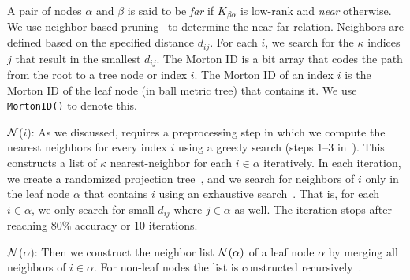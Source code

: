 A pair of nodes $\alpha$ and $\beta$ is said to be \emph{far} if
$K_{\beta\alpha}$ is low-rank and \emph{near} otherwise.
We use neighbor-based pruning~\cite{march-xiao-yu-biros-sisc16}
to determine the near-far relation.
Neighbors are  defined based on the specified distance
$d_{ij}$. For each $i$, we search for the $\kappa$ indices $j$
that result in the smallest $d_{ij}$.
The Morton ID is a bit array that codes the path from the root to a tree node or index $i$. The Morton ID of an index $i$ is the Morton ID of the leaf node (in \gofmm{} ball metric tree) that contains it.
We use \texttt{MortonID()} to denote this. 


 ${\mathcal N}$($i$): As we discussed, \gofmm{}
requires a preprocessing step in which we compute the nearest neighbors for 
every index $i$ using a greedy search (steps 1--3 in~). 
This constructs a list of $\kappa$ nearest-neighbor for each $i\in\alpha$
iteratively.
In each iteration, we create a randomized projection
tree~\cite{dasgupta-freund08,liberty2007randomized,march-xiao-yu-biros-sisc16},
and we search for neighbors of $i$ only in the leaf node $\alpha$ that contains
$i$ using an exhaustive search~\cite{yu2015performance}. That is, for each $i\in\alpha$, 
we only search for small $d_{ij}$ where $j\in\alpha$ as well. 
The iteration stops after reaching $80\%$ accuracy or 10 iterations.

 ${\mathcal N}$($\alpha$): 
Then we construct the neighbor list ${\mathcal N}(\alpha)$ of a leaf node 
$\alpha$ by merging all neighbors of $i \in \alpha$. For non-leaf nodes 
the list is constructed recursively~\cite{march-xiao-biros-fmm-e15}.

